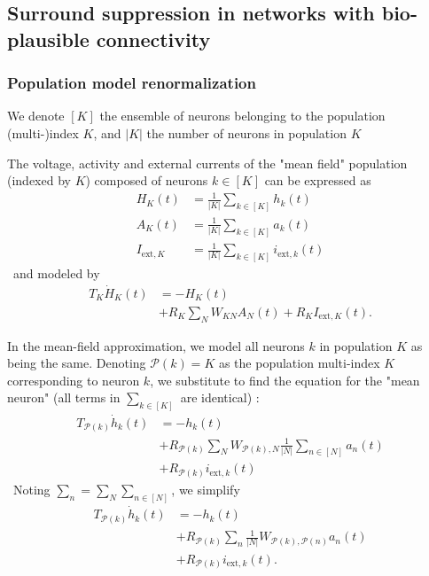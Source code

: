 \documentclass[10pt,conference,compsocconf,a4paper]{IEEEtran}
\begin{document}
	\subsection{Surround suppression in networks with bio-plausible connectivity}
	\label{sec23}

		\subsubsection{Population model renormalization}
		\label{sec231}

			We denote $[K]$ the ensemble of neurons belonging to the population (multi-)index $K$, and $|K|$ the number of neurons in population $K$

			The voltage, activity and external currents of the "mean field" population (indexed by $K$) composed of neurons $k \in [K]$ can be expressed as
\
			\begin{equation*}
				\begin{aligned}
					H_K(t) &= \frac{1}{|K|} \sum_{k \in [K]} h_k(t)\\
					A_K(t) &= \frac{1}{|K|} \sum_{k \in [K]} a_k(t)\\
					I_{\text{ext},K} &= \frac{1}{|K|} \sum_{k \in [K]} i_{\text{ext},k}(t)
				\end{aligned}
			\end{equation*}
\
			and modeled by 
\
			\begin{equation*}
				\begin{aligned}
					T_K \dot H_K(t) &= -H_K(t) \\ &+ R_K \sum_{N} W_{KN} A_N(t) + R_K I_{\text{ext},K}(t).
				\end{aligned}
			\end{equation*}

			In the mean-field approximation, we model all neurons $k$ in population $K$ as being the same. Denoting $\mathcal P(k) = K$ as the population multi-index $K$ corresponding to neuron $k$, we substitute to find the equation for the "mean neuron" (all terms in $\sum_{k \in [K]}$ are identical) :
\
			\begin{equation*}
				\begin{aligned}
					T_{\mathcal P(k)} \dot h_k(t) &= - h_k(t) \\ &+ R_{\mathcal P(k)} \sum_N W_{\mathcal P(k),N} \frac{1}{|N|} \sum_{n \in [N]} a_n(t) \\ &+ R_{\mathcal P(k)} i_{\text{ext},k}(t)
				\end{aligned}
			\end{equation*}
\
			Noting $\sum_n = \sum_N \sum_{n \in [N]}$, we simplify
\
			\begin{equation*}
				\begin{aligned}
					T_{\mathcal P(k)} \dot h_k(t) &= - h_k(t) \\ &+ R_{\mathcal P(k)} \sum_n \frac{1}{|N|} W_{\mathcal P(k),\mathcal P(n)} a_n(t) \\ &+ R_{\mathcal P(k)} i_{\text{ext},k}(t).
				\end{aligned}
			\end{equation*}
\end{document}

